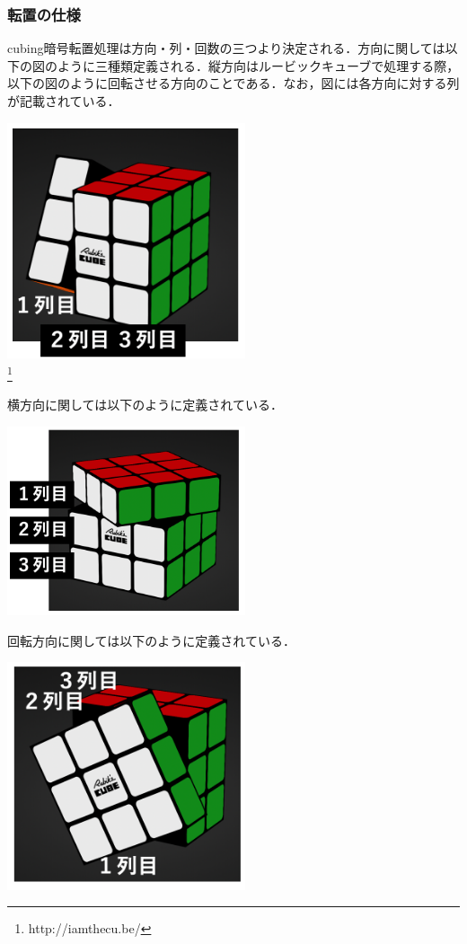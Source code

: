 \documentclass[a4p]{jarticle}
\begin{document}
\subsubsection{転置の仕様}
cubing暗号転置処理は方向・列・回数の三つより決定される．方向に関しては以下の図のように三種類定義される．縦方向はルービックキューブで処理する際，以下の図のように回転させる方向のことである．なお，図には各方向に対する列が記載されている．
\begin{center}
  \includegraphics[width=7cm]{./tex_pic/tate.jpg}\\
\footnote{http://iamthecu.be/}
\end{center}
横方向に関しては以下のように定義されている．
\begin{center}
  \includegraphics[width=7cm]{./tex_pic/yoko.jpg}\\
\footnotemark[1]
\end{center}
回転方向に関しては以下のように定義されている．
\begin{center}
  \includegraphics[width=7cm]{./tex_pic/kai.jpg}\\
\footnotemark[1]
\end{center}
\end{document}
